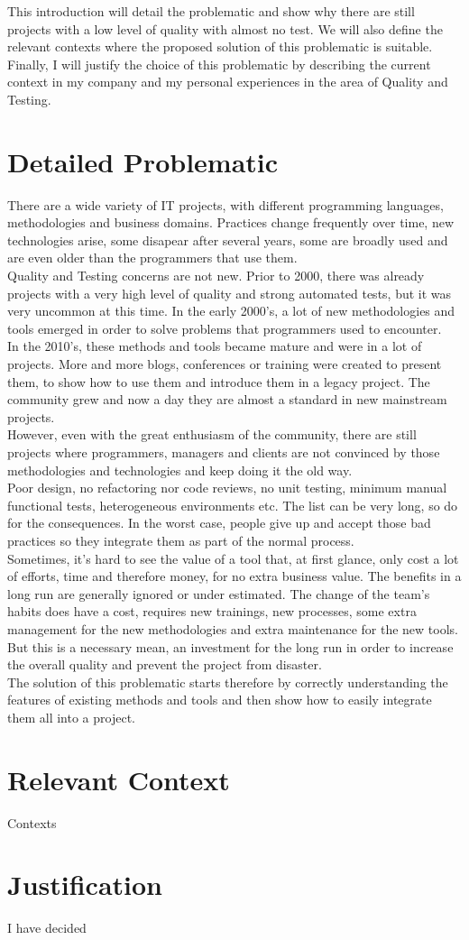 This introduction will detail the problematic and show why there are
still projects with a low level of quality with almost no test.
We will also define the relevant contexts where the proposed solution
of this problematic is suitable.
Finally, I will justify the choice of this problematic by describing the
current context in my company and my personal experiences in the area of
Quality and Testing.
\section{Detailed Problematic}\label{sec:detailed-problematic}
There are a wide variety of IT projects, with different programming
languages, methodologies and business domains.
Practices change frequently over time, new technologies arise,
some disapear after several years, some are broadly used and are even older
than the programmers that use them. \\
Quality and Testing concerns are not new.
Prior to 2000, there was already projects with a very high level of quality
and strong automated tests, but it was very uncommon at this time.
In the early 2000's, a lot of new methodologies and tools emerged in order
to solve problems that programmers used to encounter. \\
In the 2010's, these methods and tools became mature and were in a
lot of projects.
More and more blogs, conferences or training were created to present them,
to show how to use them and introduce them in a legacy project.
The community grew and now a day they are almost a standard in new mainstream
projects. \\
\newline
However, even with the great enthusiasm of the community, there are still
projects where programmers, managers and clients are not convinced by
those methodologies and technologies and keep doing it the old way. \\
Poor design, no refactoring nor code reviews, no unit testing, minimum
manual functional tests, heterogeneous environments etc.
The list can be very long, so do for the consequences.
In the worst case, people give up and accept those bad practices so they
integrate them as part of the normal process. \\
Sometimes, it's hard to see the value of a tool that, at first glance, only
cost a lot of efforts, time and therefore money, for no extra business value.
The benefits in a long run are generally ignored or under estimated.
The change of the team's habits does have a cost, requires new trainings,
new processes, some extra management for the new methodologies and
extra maintenance for the new tools.
But this is a necessary mean, an investment for the long run in order to
increase the overall quality and prevent the project from disaster. \\
\newline
The solution of this problematic starts therefore by correctly understanding
the features of existing methods and tools and then show how to easily
integrate them all into a project.

\section{Relevant Context}\label{sec:relevant-context}
Contexts

\section{Justification}\label{sec:justification}
I have decided